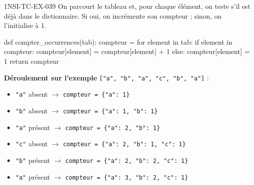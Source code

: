 \begin{corrige}{1NSI-TC-EX-039}
On parcourt le tableau et, pour chaque élément, on teste s'il est déjà dans le dictionnaire. Si oui, on incrémente son compteur ; sinon, on l'initialise à 1.

\begin{python}
def compter_occurrences(tab):
    compteur = {}
    for element in tab:
        if element in compteur:
            compteur[element] = compteur[element] + 1
        else:
            compteur[element] = 1
    return compteur
\end{python}

\textbf{Déroulement sur l'exemple} \lstinline{["a", "b", "a", "c", "b", "a"]} :
\begin{itemize}
  \item \lstinline{"a"} absent $\to$ \lstinline|compteur = {"a": 1}|
  \item \lstinline{"b"} absent $\to$ \lstinline|compteur = {"a": 1, "b": 1}|
  \item \lstinline{"a"} présent $\to$ \lstinline|compteur = {"a": 2, "b": 1}|
  \item \lstinline{"c"} absent $\to$ \lstinline|compteur = {"a": 2, "b": 1, "c": 1}|
  \item \lstinline{"b"} présent $\to$ \lstinline|compteur = {"a": 2, "b": 2, "c": 1}|
  \item \lstinline{"a"} présent $\to$ \lstinline|compteur = {"a": 3, "b": 2, "c": 1}|
\end{itemize}
\end{corrige}
